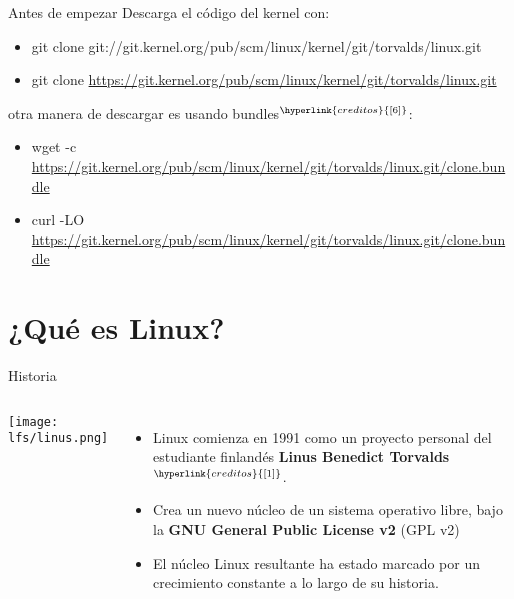 
\begin{frame}[c]{Antes de empezar}
  Descarga el código del kernel con:
  \begin{itemize}
    \item git clone git://git.kernel.org/pub/scm/linux/kernel/git/torvalds/linux.git
    \item git clone
      \href{https://git.kernel.org/pub/scm/linux/kernel/git/torvalds/linux.git}
      {https://git.kernel.org/pub/scm/linux/kernel/git/torvalds/linux.git}
  \end{itemize}

  \vspace{\baselineskip}
  otra manera de descargar es usando bundles$^{\hyperlink{creditos}{[6]}}$:
  \begin{itemize}
    \item wget -c
      \href{https://git.kernel.org/pub/scm/linux/kernel/git/torvalds/linux.git/clone.bundle}
      {https://git.kernel.org/pub/scm/linux/kernel/git/torvalds/linux.git/clone.bundle}
    \item curl -LO
      \href{https://git.kernel.org/pub/scm/linux/kernel/git/torvalds/linux.git/clone.bundle}
      {https://git.kernel.org/pub/scm/linux/kernel/git/torvalds/linux.git/clone.bundle}
  \end{itemize}
\end{frame}

\section{¿Qué es Linux?}

\begin{frame}[c]{Historia}
  \begin{columns}
      \begin{center}
        \texttt{[image: lfs/linus.png]}
      \end{center}
     \begin{itemize}
      \item Linux comienza en 1991 como un proyecto personal del estudiante
        finlandés \textbf{Linus Benedict Torvalds}$^{\hyperlink{creditos}{[1]}}$.
      \pausa
      \item Crea un nuevo núcleo de un sistema operativo libre, bajo la
        \textbf{GNU General Public License v2} (GPL v2)
      \pausa
      \item El núcleo Linux resultante ha estado marcado por un crecimiento
        constante a lo largo de su historia.
     \end{itemize}
  \end{columns}
\end{frame}

